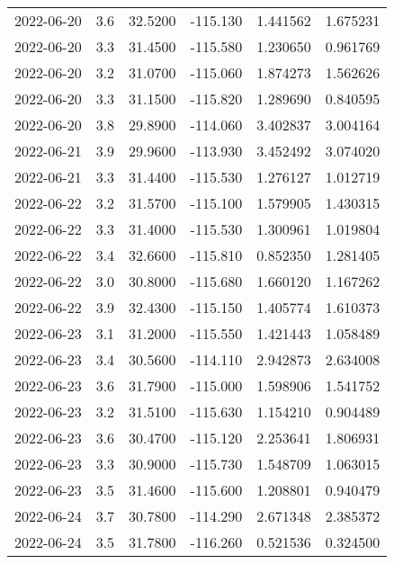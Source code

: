 \begin{tabular}{lrrrrr}
2022-06-20 &       3.6 &  32.5200 &  -115.130 &         1.441562 &         1.675231 \\
2022-06-20 &       3.3 &  31.4500 &  -115.580 &         1.230650 &         0.961769 \\
2022-06-20 &       3.2 &  31.0700 &  -115.060 &         1.874273 &         1.562626 \\
2022-06-20 &       3.3 &  31.1500 &  -115.820 &         1.289690 &         0.840595 \\
2022-06-20 &       3.8 &  29.8900 &  -114.060 &         3.402837 &         3.004164 \\
2022-06-21 &       3.9 &  29.9600 &  -113.930 &         3.452492 &         3.074020 \\
2022-06-21 &       3.3 &  31.4400 &  -115.530 &         1.276127 &         1.012719 \\
2022-06-22 &       3.2 &  31.5700 &  -115.100 &         1.579905 &         1.430315 \\
2022-06-22 &       3.3 &  31.4000 &  -115.530 &         1.300961 &         1.019804 \\
2022-06-22 &       3.4 &  32.6600 &  -115.810 &         0.852350 &         1.281405 \\
2022-06-22 &       3.0 &  30.8000 &  -115.680 &         1.660120 &         1.167262 \\
2022-06-22 &       3.9 &  32.4300 &  -115.150 &         1.405774 &         1.610373 \\
2022-06-23 &       3.1 &  31.2000 &  -115.550 &         1.421443 &         1.058489 \\
2022-06-23 &       3.4 &  30.5600 &  -114.110 &         2.942873 &         2.634008 \\
2022-06-23 &       3.6 &  31.7900 &  -115.000 &         1.598906 &         1.541752 \\
2022-06-23 &       3.2 &  31.5100 &  -115.630 &         1.154210 &         0.904489 \\
2022-06-23 &       3.6 &  30.4700 &  -115.120 &         2.253641 &         1.806931 \\
2022-06-23 &       3.3 &  30.9000 &  -115.730 &         1.548709 &         1.063015 \\
2022-06-23 &       3.5 &  31.4600 &  -115.600 &         1.208801 &         0.940479 \\
2022-06-24 &       3.7 &  30.7800 &  -114.290 &         2.671348 &         2.385372 \\
2022-06-24 &       3.5 &  31.7800 &  -116.260 &         0.521536 &         0.324500 \\

\end{tabular}
